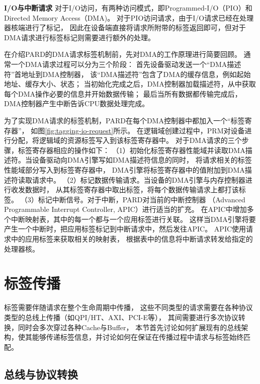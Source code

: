 \textbf{I/O与中断请求}\quad
对于I/O访问，有两种访问模式，即Programmed-I/O（PIO）和Directed Memory Access（DMA)。
对于PIO访问请求，由于I/O请求已经在处理器核端进行了标记，
因此在设备端直接将请求所附带的标签返回即可，但对于DMA请求进行标签标记则需要进行额外的处理。

在介绍PARD的DMA请求标签机制前，先对DMA的工作原理进行简要回顾。
通常一个DMA请求过程可以分为三个阶段：
首先设备驱动发送一个``DMA描述符''首地址到DMA控制器，
该``DMA描述符''包含了DMA的缓存信息，例如起始地址、缓存大小、状态；
当初始化完成之后，DMA控制器加载描述符，从中获取每个DMA操作必要的信息并开始数据传输；
最后当所有数据都传输完成后，DMA控制器产生中断告诉CPU数据处理完成。

为了实现DMA请求的标签机制，PARD在每个DMA控制器中都加入一个``标签寄存器''，
如图\ref{fig:tagging-io-request}所示。
在逻辑域创建过程中，PRM对设备进行分配，将逻辑域的资源标签写入到该标签寄存器中。
对于DMA请求的三个步骤，标签寄存器相应的操作如下：
（1）初始化标签寄存器性能域并读取DMA描述符。当设备驱动向DMA引擎写如DMA描述符信息的同时，
将请求相关的标签性能域部分写入到标签寄存器中，
DMA引擎将标签寄存器中的值附加到DMA描述符读取请求中。
（2）标记数据传输请求。当设备的DMA引擎与内存控制器进行收发数据时，
从其标签寄存器中取出标签，将每个数据传输请求上都打该标签。
（3）标记中断信号。对于中断，PARD对当前的中断控制器
（Advanced Programmable Interrupt Controller, APIC）进行适当的扩充。
在APIC中增加多个中断映射表，其中的每一个都与一个应用标签进行关联。
这样当DMA引擎将要产生一个中断时，把应用标签标记到中断请求中，然后发往APIC。
APIC使用请求中的应用标签来获取相关的映射表，
根据表中的信息将中断请求转发给指定的处理器核。



\section{标签传播}
\label{chap:labeladdrspace:propagation}

标签需要伴随请求在整个生命周期中传播，
这些不同类型的请求需要在各种协议类型的总线上传播（如QPI/HT、AXI、PCI-E等），
其间需要进行多次协议转换，同时会多次穿过各种Cache与Buffer，
本节首先讨论如何扩展现有的总线架构，使其能够传递标签信息，并讨论如何在保证在传播过程中请求与标签始终匹配。

\subsection{总线与协议转换}

